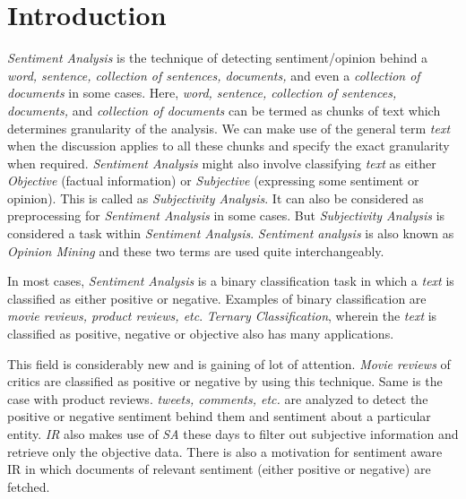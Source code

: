 
\chapter{Introduction} %

\label{introduction} %


\par 
\textit{Sentiment Analysis} is the technique of detecting sentiment/opinion behind a \textit{word, sentence, collection of sentences, documents,} 
and even a \textit{collection of documents} in some cases. Here, \textit{word, sentence, collection of sentences, documents,} and \textit{collection of 
documents} can be termed as chunks of text which determines granularity of the analysis. We can make use of the general term 
\emph{text} when the discussion applies to all these chunks and specify the exact granularity when required. \textit{Sentiment Analysis} 
might also involve classifying \emph{text} as either \emph{Objective} (factual information) or \emph{Subjective} (expressing some 
sentiment or opinion). This is called as \textit{Subjectivity Analysis}. It can also be considered as preprocessing for \textit{Sentiment Analysis} in some cases. 
But \textit{Subjectivity Analysis} is considered a task within \textit{Sentiment Analysis}. \textit{Sentiment analysis} is also known as \textit{Opinion 
Mining} and these two terms are used quite interchangeably.

\par

In most cases, \textit{Sentiment Analysis} is a binary classification task in which a \emph{text} is classified as either positive or negative.
Examples of binary classification are \textit{movie reviews, product reviews, etc}. \textit{Ternary Classification}, wherein the \emph{text} is classified
as positive, negative or objective also has many applications. 

\par

This field is considerably new and is gaining of lot of attention. \textit{Movie reviews} of critics are classified as positive or negative
by using this technique. Same is the case with product reviews. \textit{tweets, comments, etc.} are analyzed to detect the positive or negative
sentiment behind them and sentiment about a particular entity. \textit{IR} also makes use of \textit{SA} these days to filter out subjective information
and retrieve only the objective data. There is also a motivation for sentiment aware IR in which documents of relevant sentiment 
(either positive or negative) are fetched. 

